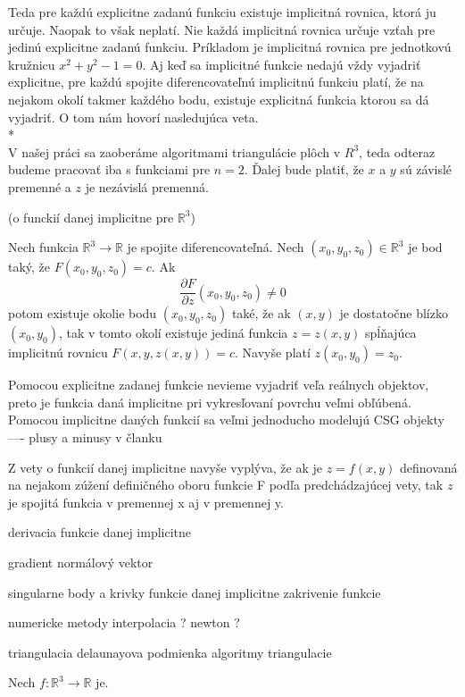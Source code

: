 Teda pre každú explicitne zadanú funkciu existuje implicitná rovnica, ktorá ju určuje.
Naopak to však neplatí. Nie každá implicitná rovnica určuje vzťah pre jedinú explicitne zadanú
funkciu. Príkladom je implicitná rovnica pre jednotkovú kružnicu $x^2 + y^2 - 1 = 0$. 
Aj keď sa implicitné funkcie nedajú vždy vyjadriť explicitne, pre každú spojite diferencovateľnú
implicitnú funkciu platí, že na nejakom okolí takmer každého bodu, existuje explicitná funkcia
ktorou sa dá vyjadriť.
O tom nám hovorí nasledujúca veta.
\\*
\\
V našej práci sa zaoberáme algoritmami triangulácie plôch v $R^3$, teda odteraz
budeme pracovať iba s funkciami pre $n = 2$. Ďalej bude platiť, že $x$ a $y$ sú 
závislé premenné a $z$ je nezávislá premenná.


\begin{theorem}
 (o funckií danej implicitne pre $\mathbb{R}^3$)
 
 Nech funkcia $\mathbb{R}^3 \to \mathbb{R}$ je spojite diferencovateľná. 
 Nech $(x_0, y_0, z_0) \in \mathbb{R}^3$ je bod taký, že $F(x_0, y_0, z_0) = c$.
 Ak $$\frac{\partial F}{\partial z} (x_0, y_0, z_0) \neq 0$$ potom existuje okolie 
 bodu $(x_0, y_0, z_0)$ také, že ak $(x, y)$ je dostatočne blízko $(x_0, y_0)$, 
 tak v tomto okolí existuje jediná funkcia $z = z(x ,y)$ spĺňajúca implicitnú rovnicu
 $F(x, y, z(x, y)) = c$. Navyše platí $z(x_0, y_0) = z_0$.
\end{theorem}

Pomocou explicitne zadanej funkcie nevieme vyjadriť veľa reálnych objektov, 
preto je funkcia daná implicitne pri vykresľovaní povrchu veľmi obľúbená. 
Pomocou implicitne daných funkcií sa veľmi jednoducho modelujú CSG objekty 
---- plusy a minusy v članku 

\begin{note}
    Z vety o funkcií danej implicitne navyše vyplýva, že ak je $z = f(x,y)$ definovaná na nejakom 
    zúžení definičného oboru funkcie F podľa predchádzajúcej vety, tak $z$ je spojitá funkcia v 
    premennej x aj v premennej y. 
\end{note}

derivacia funkcie danej implicitne

gradient
normálový vektor

singularne body a krivky funkcie danej implicitne
zakrivenie funkcie

numericke metody
interpolacia ?
newton ?

triangulacia
delaunayova podmienka
algoritmy triangulacie

\begin{definition}
    Nech $f : \mathbb{R}^3 \to \mathbb{R}$ je.
\end{definition}





